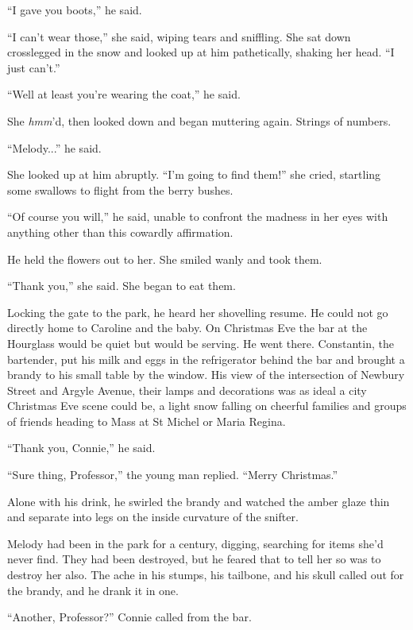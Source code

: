 \documentclass[11pt,a5paper]{article}
\begin{document}
``I gave you boots,'' he said.

``I can't wear those,'' she said, wiping tears and sniffling. She sat down crosslegged in the snow and looked up at him pathetically, shaking her head. ``I just can't.''

``Well at least you're wearing the coat,'' he said.

She \emph{hmm}'d, then looked down and began muttering again. Strings of numbers.

``Melody...'' he said.

She looked up at him abruptly. ``I'm going to find them!'' she cried, startling some swallows to flight from the berry bushes.

``Of course you will,'' he said, unable to confront the madness in her eyes with anything other than this cowardly affirmation.

He held the flowers out to her. She smiled wanly and took them.

``Thank you,'' she said. She began to eat them.

\vspace{1em}

Locking the gate to the park, he heard her shovelling resume. He could not go directly home to Caroline and the baby. On Christmas Eve the bar at the Hourglass would be quiet but would be serving. He went there. Constantin, the bartender, put his milk and eggs in the refrigerator behind the bar and brought a brandy to his small table by the window. His view of the intersection of Newbury Street and Argyle Avenue, their lamps and decorations was as ideal a city Christmas Eve scene could be, a light snow falling on cheerful families and groups of friends heading to Mass at St Michel or Maria Regina.

``Thank you, Connie,'' he said.

``Sure thing, Professor,'' the young man replied. ``Merry Christmas.''

Alone with his drink, he swirled the brandy and watched the amber glaze thin and separate into legs on the inside curvature of the snifter.

Melody had been in the park for a century, digging, searching for items she'd never find. They had been destroyed, but he feared that to tell her so was to destroy her also. The ache in his stumps, his tailbone, and his skull called out for the brandy, and he drank it in one.

``Another, Professor?'' Connie called from the bar.
\end{document}
